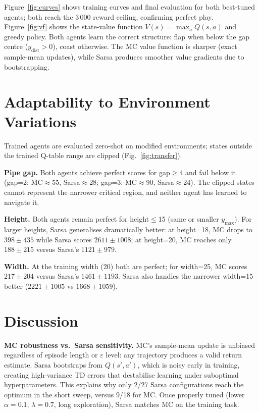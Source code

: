 \documentclass[runningheads]{llncs}
\begin{document}
Figure~\ref{fig:curves} shows training curves and final evaluation for both
best-tuned agents; both reach the 3\,000 reward ceiling, confirming perfect
play.
Figure~\ref{fig:vf} shows the state-value function $V(s)=\max_a Q(s,a)$ and
greedy policy.
Both agents learn the correct structure: flap when below the gap centre
($y_\text{dist}>0$), coast otherwise.
The MC value function is sharper (exact sample-mean updates), while Sarsa
produces smoother value gradients due to bootstrapping.

\section{Adaptability to Environment Variations}

Trained agents are evaluated zero-shot on modified environments; states
outside the trained Q-table range are clipped (Fig.~\ref{fig:transfer}).

\textbf{Pipe gap.}
Both agents achieve perfect scores for gap$\ge$4 and fail below it
(gap=2: MC$\approx$55, Sarsa$\approx$28; gap=3: MC$\approx$90,
Sarsa$\approx$24).
The clipped states cannot represent the narrower critical region, and
neither agent has learned to navigate it.

\textbf{Height.}
Both agents remain perfect for height$\le$15 (same or smaller
$y_\text{max}$).
For larger heights, Sarsa generalises dramatically better:
at height=18, MC drops to $398\pm435$ while Sarsa scores
$2611\pm1008$; at height=20, MC reaches only $188\pm215$
versus Sarsa's $1121\pm979$.

\textbf{Width.}
At the training width (20) both are perfect; for width=25, MC scores
$217\pm204$ versus Sarsa's $1461\pm1193$.
Sarsa also handles the narrower width=15 better
($2221\pm1005$ vs $1668\pm1059$).

\section{Discussion}

\textbf{MC robustness vs.\ Sarsa sensitivity.}
MC's sample-mean update is unbiased regardless of episode length or
$\varepsilon$ level: any trajectory produces a valid return estimate.
Sarsa bootstraps from $Q(s',a')$, which is noisy early in training, creating
high-variance TD errors that destabilise learning under suboptimal
hyperparameters.
This explains why only 2/27 Sarsa configurations reach the optimum in the
short sweep, versus 9/18 for MC.
Once properly tuned (lower $\alpha=0.1$, $\lambda=0.7$, long exploration),
Sarsa matches MC on the training task.
\end{document}
